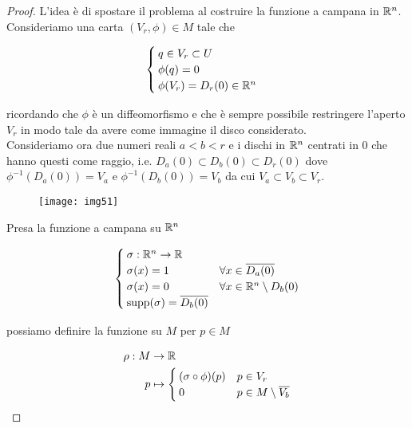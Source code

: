 \begin{proof}
	L'idea è di spostare il problema al costruire la funzione a campana in $ \mathbb{R}^{n} $.\\
	Consideriamo una carta $ (V_{r},\phi) \in M $ tale che
	
	\begin{equation}
		\begin{cases}
			q \in V_{r} \subset U\\
			\phi(q) = 0\\
			\phi(V_{r}) = D_{r}(0) \in \mathbb{R}^{n}
		\end{cases}
	\end{equation}

	ricordando che $ \phi $ è un diffeomorfismo e che è sempre possibile restringere l'aperto $ V_{r} $ in modo tale da avere come immagine il disco considerato.\\
	Consideriamo ora due numeri reali $ a < b < r $ e i dischi in $ \mathbb{R}^{n} $ centrati in 0 che hanno questi come raggio, i.e. $ D_{a}(0) \subset D_{b}(0) \subset D_{r}(0) $ dove $ \phi^{-1}(D_{a}(0)) = V_{a} $ e $ \phi^{-1}(D_{b}(0)) = V_{b} $ da cui $ V_{a} \subset V_{b} \subset V_{r} $.
	
	\begin{figure}[H]
		\centering
		\texttt{[image: img51]}
	\end{figure}	
	
	Presa la funzione a campana su $ \mathbb{R}^{n} $
	
	\begin{equation}
		\begin{cases}
			\sigma : \mathbb{R}^{n} \to \mathbb{R}\\
			\sigma(x) = 1 & \forall x \in \overline{D_{a}(0)}\\
			\sigma(x) = 0 & \forall x \in \mathbb{R}^{n} \setminus D_{b}(0)\\
			\operatorname{supp}(\sigma) = \overline{D_{b}(0)}
		\end{cases}
	\end{equation}

	possiamo definire la funzione su $ M $ per $ p \in M $
	
	\begin{align}
		\begin{split}
			\rho : M &\to \R\\
			p &\mapsto %
			\begin{cases}
				(\sigma \circ \phi)(p) & p \in V_{r}\\
				0 & p \in M \setminus \overline{V_{b}}
			\end{cases}
		\end{split}
	\end{align}


\end{proof}

